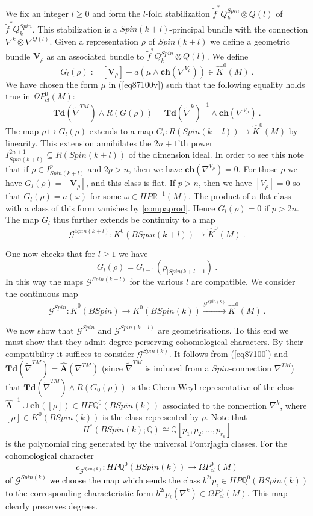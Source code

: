 \documentclass[12pt]{article}
\newcommand{\cG}{{\mathcal{G}}}
\newcommand{\hA}{{\mathbf{\hat A}}}
\newcommand{\Q}{{\mathbb{Q}}}
\newcommand{\R}{{\mathbb{R}}}
\newcommand{\Td}{{\mathbf{Td}}}
\newcommand{\ch}{{\mathbf{ch}}}
\newcommand{\bV}{{\mathbf{V}}}
\begin{document}
We fix an integer $l\ge 0$ and form  the $l$-fold stabilization 
$\tilde f^{*}Q^{Spin}_{k}\otimes Q(l)$ of $\tilde f^{*}Q^{Spin}_{k}$. This stabilization is a $Spin(k+l)$-principal bundle with the connection  $\nabla^{k}\otimes \nabla^{Q(l)}$.
Given a  representation $\rho$ of $Spin(k+l)$
we define a geometric bundle $\bV_{\rho}$ as an associated bundle to $\tilde f^{*}Q^{Spin}_{k}\otimes Q(l)$.  We define
$$G_{l}(\rho):=[\bV_{\rho}]-a(\mu\wedge \ch(\nabla^{V_{\rho}}))\in \hat K^{0}(M)\ .$$
We have chosen the form $\mu$ in (\ref{eq87100v}) such that the following equality holds true in $\Omega P^{0}_{cl}(M)$:
\begin{equation}\label{eq87100}\Td(\tilde \nabla^{TM})\wedge R(G(\rho))=\Td(\tilde \nabla^{k})^{-1}\wedge \ch(\nabla^{V_{\rho}})\ .\end{equation}
The map $\rho\mapsto G_{l}(\rho)$
extends to a map
$G_{l}:R(Spin(k+l))\to \hat K^{0}(M)$ by linearity.
This extension  annihilates the $2n+1$'th power
$I_{Spin(k+l)}^{2n+1}\subseteq R(Spin(k+l))$ of the dimension ideal.
In order to see this note that  if $\rho\in I^{p}_{Spin(k+l)}$ and  $2p>n$, then we have $\ch(\nabla^{V_{\rho}})=0$.
For those $\rho$ we have
$G_{l}(\rho)=[\bV_{\rho}]$, and this class is flat.
If $p>n$, then we have $[V_{\rho}]=0$ so that
$G_{l}(\rho)=a(\omega)$ for some $\omega\in HP\R^{-1}(M)$.
The product of a flat class with a class of this form vanishes by \eqref{compaprod}.
Hence $G_{l}(\rho)=0$ if $p>2n$.
The map $G_{l}$ thus further extends be continuity 
to
a map
$$\cG^{Spin(k+l)}:K^{0}(BSpin(k+l))\to \hat K^{0}(M)\ .$$
 
One now checks that for $l\ge 1$ we have
$$G_{l}(\rho)=G_{l-1}(\rho_{|Spin(k+l-1})\ .$$
In this way the maps $\cG^{Spin(k+l)}$ for the various $l$ are compatible. We consider the continuous map
$$\cG^{Spin}:\bar K^{0}(BSpin)\to K^{0}(BSpin(k))\stackrel{\cG^{Spin(k)}}{\to} \hat K^{0}(M)\ .$$
 
 
We now show that $\cG^{Spin}$ and $\cG^{Spin(k+l)}$ are geometrisations.   To this end we must show that they admit degree-perserving cohomological characters.  By their compatibility it suffices to consider $\cG^{Spin(k)}$.
It follows from (\ref{eq87100}) and $\Td(\tilde \nabla^{TM})=\hA(\nabla^{TM})$ (since $\tilde \nabla^{TM}$ is induced from a $Spin$-connection $\nabla^{TM}$) that
$\Td(\tilde \nabla^{TM})\wedge R(G_{0}(\rho))$ is the Chern-Weyl representative of the class
$\hA^{-1}\cup \ch([\rho])\in HP\Q^{0}(BSpin(k))$ associated to the connection
$\nabla^{k}$, where $[\rho]\in K^{0}(BSpin(k))$ is the class represented by $\rho$. Note that
\begin{equation}\label{eqf1}H^{*}(BSpin(k);\Q)\cong \Q[p_{1},p_{2},\dots,p_{r_{k}}]\end{equation}
is the polynomial ring generated by the universal Pontrjagin classes. \textcolor{black}{For the cohomological    character $$c_{\cG^{Spin(k)}}: HP\Q^{0}(BSpin(k))\to \Omega P_{cl}^{0}(M)$$  of $\cG^{Spin(k)}$ we choose the map which sends}   the class  $b^{2i}p_{i}\in HP\Q^{0}(BSpin(k))$ to the corresponding characteristic form $b^{2i}p_{i}(\nabla^{k})\in \Omega P^{0}_{cl}(M)$.
 This map clearly preserves degrees.
 
\end{document}

